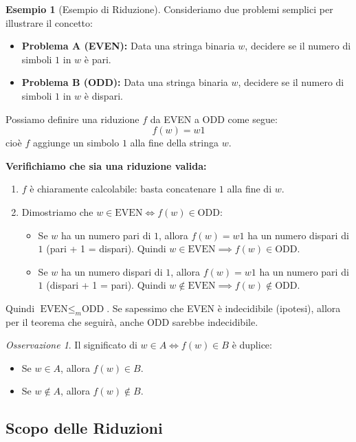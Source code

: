 \documentclass[a4paper]{article}
\theoremstyle{definition} %
\newtheorem{example}{Esempio}
\theoremstyle{remark} %
\newtheorem{remark}{Osservazione}
\begin{document}
\begin{example}[Esempio di Riduzione]
Consideriamo due problemi semplici per illustrare il concetto:
\begin{itemize}
    \item \textbf{Problema A (EVEN):} Data una stringa binaria $w$, decidere se il numero di simboli $1$ in $w$ è pari.
    \item \textbf{Problema B (ODD):} Data una stringa binaria $w$, decidere se il numero di simboli $1$ in $w$ è dispari.
\end{itemize}

Possiamo definire una riduzione $f$ da EVEN a ODD come segue:
$$f(w) = w1$$
cioè $f$ aggiunge un simbolo $1$ alla fine della stringa $w$.

\textbf{Verifichiamo che sia una riduzione valida:}
\begin{enumerate}
    \item $f$ è chiaramente calcolabile: basta concatenare $1$ alla fine di $w$.
    \item Dimostriamo che $w \in \text{EVEN} \iff f(w) \in \text{ODD}$:
    \begin{itemize}
        \item Se $w$ ha un numero pari di $1$, allora $f(w) = w1$ ha un numero dispari di $1$ (pari + 1 = dispari). Quindi $w \in \text{EVEN} \implies f(w) \in \text{ODD}$.
        \item Se $w$ ha un numero dispari di $1$, allora $f(w) = w1$ ha un numero pari di $1$ (dispari + 1 = pari). Quindi $w \notin \text{EVEN} \implies f(w) \notin \text{ODD}$.
    \end{itemize}
\end{enumerate}

Quindi $\text{EVEN} \le_m \text{ODD}$. Se sapessimo che EVEN è indecidibile (ipotesi), allora per il teorema che seguirà, anche ODD sarebbe indecidibile.
\end{example}

\begin{remark}
Il significato di $w \in A \iff f(w) \in B$ è duplice:
\begin{itemize}
    \item Se $w \in A$, allora $f(w) \in B$.
    \item Se $w \notin A$, allora $f(w) \notin B$.
\end{itemize}
\end{remark}

\subsection{Scopo delle Riduzioni}
\end{document}
